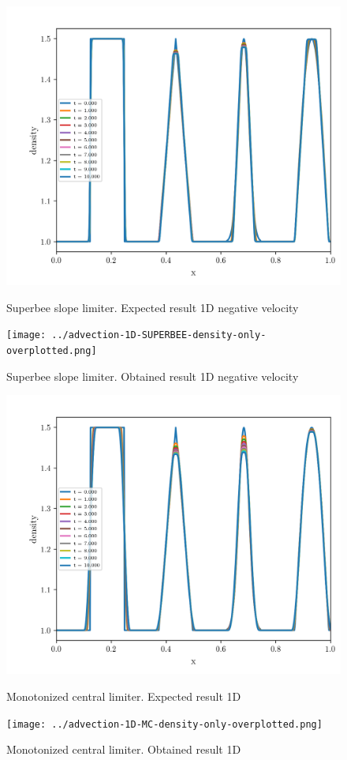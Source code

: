 \begin{figure}[htbp]
    \centering
	\includegraphics[width=.7\textwidth]{./figures/advection-1D-SUPERBEE-density-only-overplotted.png}%
	\caption{Superbee slope limiter. Expected result 1D negative velocity}
	\texttt{[image: ../advection-1D-SUPERBEE-density-only-overplotted.png]}%
	\caption{Superbee slope limiter. Obtained result 1D negative velocity}
\end{figure}

\begin{figure}[htbp]
    \centering
	\includegraphics[width=.7\textwidth]{./figures/advection-1D-MC-density-only-overplotted.png}%
	\caption{Monotonized central limiter. Expected result 1D}
	\texttt{[image: ../advection-1D-MC-density-only-overplotted.png]}%
	\caption{Monotonized central limiter. Obtained result 1D}
\end{figure}

